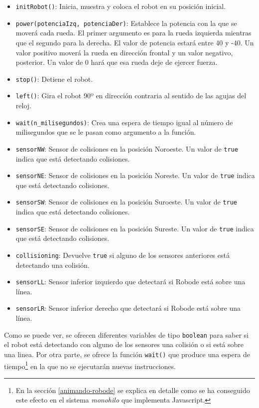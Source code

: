 \begin{itemize}
	\item \texttt{initRobot()}: Inicia, muestra y coloca el robot en su posición inicial.
	\item \texttt{power(potenciaIzq, potenciaDer)}: Establece la potencia con la que se moverá cada rueda. El primer argumento es para la rueda izquierda mientras que el segundo para la derecha. El valor de potencia estará entre 40 y -40. Un valor positivo moverá la rueda en dirección frontal y un valor negativo, posterior. Un valor de 0 hará que esa rueda deje de ejercer fuerza.
	\item \texttt{stop()}: Detiene el robot.
	\item \texttt{left()}: Gira el robot 90º en dirección contraria al sentido de las agujas del reloj.
	\item \texttt{wait(n\_milisegundos)}: Crea una espera de tiempo igual al número de milisegundos que se le pasan como argumento a la función. 
	\item \texttt{sensorNW}: Sensor de colisiones en la posición Noroeste. Un valor de \texttt{true} indica que está detectando colisiones.
	\item \texttt{sensorNE}: Sensor de colisiones en la posición Noreste. Un valor de \texttt{true} indica que está detectando colisiones.
	\item \texttt{sensorSW}: Sensor de colisiones en la posición Suroeste. Un valor de \texttt{true} indica que está detectando colisiones.
	\item \texttt{sensorSE}: Sensor de colisiones en la posición Sureste. Un valor de \texttt{true} indica que está detectando colisiones.
	\item \texttt{collisioning}: Devuelve \texttt{true} si alguno de los sensores anteriores está detectando una colisión.
	\item \texttt{sensorLL}: Sensor inferior izquierdo que detectará si Robode está sobre una línea.
	\item \texttt{sensorLR}: Sensor inferior derecho que detectará si Robode está sobre una línea.
\end{itemize}

Como se puede ver, se ofrecen diferentes variables de tipo \texttt{boolean} para saber si el robot está detectando con alguno de los sensores una colisión o si está sobre una linea. Por otra parte, se ofrece la función \texttt{wait()} que produce una espera de tiempo\footnote{En la sección \ref{animando-robode} se explica en detalle como se ha conseguido este efecto en el sistema \emph{monohilo} que implementa Javascript.} en la que no se ejecutarán nuevas instrucciones.


